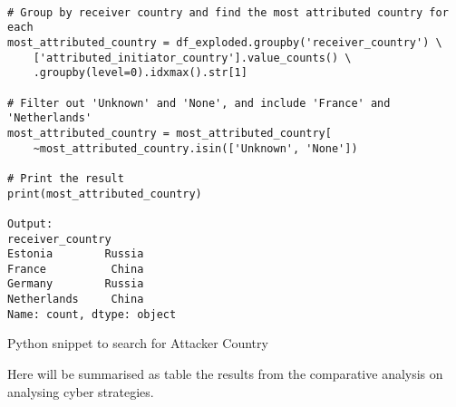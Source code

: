 \vspace{3cm}

\begin{listing}[H]
\begin{verbatim}

# Group by receiver country and find the most attributed country for each
most_attributed_country = df_exploded.groupby('receiver_country') \
    ['attributed_initiator_country'].value_counts() \
    .groupby(level=0).idxmax().str[1]

# Filter out 'Unknown' and 'None', and include 'France' and 'Netherlands'
most_attributed_country = most_attributed_country[
    ~most_attributed_country.isin(['Unknown', 'None'])

# Print the result
print(most_attributed_country)

Output:
receiver_country
Estonia        Russia
France          China
Germany        Russia
Netherlands     China
Name: count, dtype: object

\end{verbatim}
\caption{Python snippet to search for Attacker Country}
\label{cod:attacker}
\end{listing}



Here will be summarised as table the results from the comparative analysis on analysing cyber strategies. 

